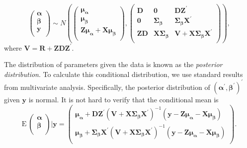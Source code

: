\begin{equation}\label{E15:JointDistn}
\left(
  \begin{array}{c}
    \boldsymbol \alpha \\
    \boldsymbol
\beta \\
    \mathbf{y} \\
  \end{array}
\right) \sim N
 \left(
 \left(
  \begin{array}{c}
    \boldsymbol {\mu_{\alpha}} \\
    \boldsymbol
{\mu_{\beta}} \\
    \mathbf{Z}\boldsymbol {\mu_{\alpha}} + \mathbf{X}\boldsymbol {\mu_{\beta}}\\
  \end{array}
\right) ,
 \left(
  \begin{array}{ccc}
    \mathbf{D} & \mathbf{0} & \mathbf{DZ}^{\prime} \\
  \mathbf{0} & \boldsymbol {\Sigma_{\beta}}& \boldsymbol {\Sigma_{\beta}}\mathbf{X}^{\prime} \\
    \mathbf{ZD} &  \mathbf{X}\boldsymbol {\Sigma_{\beta}} & \mathbf{V}
     + \mathbf{X}\boldsymbol {\Sigma_{\beta}} \mathbf{X}^{\prime}\\
  \end{array}
\right) \right) ,
\end{equation}
where $\mathbf{V = R + Z D }\mathbf{Z}^{\prime}$.



The distribution of parameters given the data is known as the
\emph{posterior distribution}. To calculate this conditional
distribution, we use standard results from multivariate analysis.
Specifically, the posterior distribution of $(\boldsymbol
\alpha^{\prime}, \boldsymbol \beta^{\prime})^{\prime}$ given
$\mathbf{y}$ is normal. It is not hard to verify that the
conditional mean is
\begin{equation}\label{E15:CondlMean}
\mathrm{E}~ \left(
  \begin{array}{c}
    \boldsymbol \alpha \\
    \boldsymbol
\beta \\
  \end{array}
\right) |  \mathbf{y} =
 \left(
  \begin{array}{c}
    \boldsymbol {\mu_{\alpha}} + \mathbf{DZ}^{\prime}
    (\mathbf{V}
     + \mathbf{X}\boldsymbol {\Sigma_{\beta}}
     \mathbf{X}^{\prime})^{-1}
     (\mathbf{y} -\mathbf{Z}\boldsymbol {\mu_{\alpha}} - \mathbf{X}\boldsymbol
     {\mu_{\beta}})    \\
    \boldsymbol
{\mu_{\beta}} + \boldsymbol {\Sigma_{\beta}}\mathbf{X}^{\prime}
  (\mathbf{V}
     + \mathbf{X}\boldsymbol {\Sigma_{\beta}}
     \mathbf{X}^{\prime})^{-1}
     (\mathbf{y} -\mathbf{Z}\boldsymbol {\mu_{\alpha}} - \mathbf{X}\boldsymbol
     {\mu_{\beta}}) \\
       \end{array}
\right) .
\end{equation}

